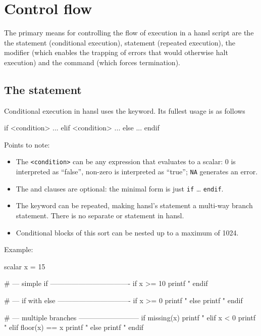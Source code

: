 \chapter{Control flow}
\label{chap:hp-ctrlflow}

The primary means for controlling the flow of execution in a hansl
script are the the  statement (conditional execution),
 statement (repeated execution), the  modifier
(which enables the trapping of errors that would otherwise halt
execution) and the  command (which forces termination).

\section{The  statement}

Conditional execution in hansl uses the  keyword. Its fullest
usage is as follows
\begin{code}
if <condition>
   ...
elif <condition>
   ...
else 
   ...
endif  
\end{code}

Points to note:
\begin{itemize}
\item The \texttt{<condition>} can be any expression that evaluates to a
  scalar: 0 is interpreted as ``false'', non-zero is interpreted as
  ``true''; \texttt{NA} generates an error.
\item The  and  clauses are optional: the minimal
  form is just \texttt{if} \dots{} \texttt{endif}.
\item The  keyword can be repeated, making hansl's 
  statement a multi-way branch statement. There is no separate
   or  statement in hansl.
\item Conditional blocks of this sort can be nested up to a maximum of
  1024.
\end{itemize}

Example:
\begin{code}
scalar x = 15

# --- simple if ----------------------------------
if x >= 10
   printf "%
endif

# --- if with else -------------------------------
if x >= 0
   printf "%
else
   printf "%
endif

# --- multiple branches --------------------------
if missing(x)
   printf "%
elif x < 0
   printf "%
elif floor(x) == x
   printf "%
else
   printf "%
endif
\end{code}

